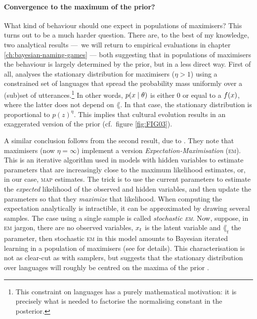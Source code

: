 \documentclass{../src/bcthesispart}
\begin{document}
\paragraph{Convergence to the maximum of the prior?}

What kind of behaviour should one expect in populations of maximisers?
This turns out to be a much harder question.
There are, to the best of my knowledge, two analytical results — we will return to empirical evaluations in chapter \ref{ch:bayesian-naming-games} — both suggesting that in populations of maximisers the behaviour is largely determined by the prior, but in a less direct way.
First of all, \textcite{Kirby2007} analyses the stationary distribution for maximisers ($\eta>1$) using a constrained set of languages that spread the probability mass uniformly over a (sub)set of utterances.\footnote{%
	This constraint on languages has a purely mathematical motivation: it is precisely what is needed to factorise the normalising constant in the posterior.
	}
In other words, $p(x \mid \theta)$ is either 0 or equal to a $f(x)$, where the latter does not depend on $\lang$.
In that case, the stationary distribution is proportional to $p(z)^\eta$.
This implies that cultural evolution results in an exaggerated version of the prior (cf.~figure \ref{fig:FIG03}).




A similar conclusion follows from the second result, due to \textcite{Griffiths2007a}.
They note that maximisers (now $\eta=\infty$) implement a version \emph{Expectation-Maximisation} (\textsc{em}).
This is an iterative algorithm used in models with hidden variables to estimate parameters that are increasingly close to the maximum likelihood estimates, or, in our case, \textsc{map} estimates.
The trick is to use the current parameters to estimate the \emph{expected} likelihood of the observed and hidden variables, and then update the parameters so that they \emph{maximize} that likelihood.
When computing the expectation analytically is intractible, it can be approximated by drawing several samples.
The case using a single sample is called \emph{stochastic \textsc{em}}.
Now, suppose, in \textsc{em} jargon, there are no observed variables, $x_t$ is the latent variable and $\lang_t$ the parameter, then stochastic \textsc{em} in this model amounts to Bayesian iterated learning in a population of maximisers (see \textcite{Griffiths2007a} for details).
This characterisation is not as clear-cut as with samplers, but suggests that the stationary distribution over languages will roughly be centred on the maxima of the prior \parencite{Griffiths2007a}.
\end{document}
